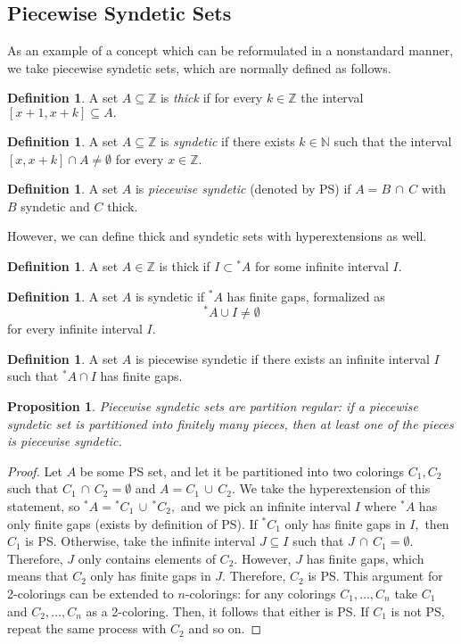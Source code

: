 \documentclass[12pt]{amsart}
\newcommand{\stt}{{}^*}
\newcommand{\NN}{\mathbb{N}}
\newcommand{\ZZ}{\mathbb{Z}}
\theoremstyle{plain}
\newtheorem{prop}[thm]{Proposition}
\theoremstyle{definition}
\newtheorem{defn}[thm]{Definition}
\theoremstyle{remark}
\theoremstyle{theorem}
\numberwithin{equation}{section}
\numberwithin{thm}{section}
\begin{document}
\subsection{Piecewise Syndetic Sets}
As an example of a concept which can be reformulated in a nonstandard manner, we take piecewise syndetic sets, which are normally defined as follows.
\begin{defn}
A set $A \subseteq \ZZ$ is \textit{thick} if for every $k \in \ZZ$ the interval $[x+1, x+k] \subseteq A.$
\end{defn}
\begin{defn}
A set $A \subseteq \ZZ$ is \textit{syndetic} if there exists $k \in \NN$ such that the interval $[x,x+k] \cap A \neq \emptyset$ for every $x \in \ZZ.$
\end{defn}
\begin{defn}
A set $A$ is \textit{piecewise syndetic} (denoted by PS) if $A = B \, \cap  \,C$ with $B$ syndetic and $C$ thick.
\end{defn}
However, we can define thick and syndetic sets with hyperextensions as well.
\begin{defn}
A set $A \in \ZZ$ is thick if $I \subset \stt A$ for some infinite interval $I.$
\end{defn}
\begin{defn}
A set $A$ is syndetic if $\stt A$ has finite gaps, formalized as \[\stt A \cup I \neq \emptyset\] for every infinite interval $I.$
\end{defn}
\begin{defn}
A set $A$ is piecewise syndetic if there exists an infinite interval $I$ such that $\stt A \cap I$ has finite gaps.
\end{defn}
\begin{prop}
Piecewise syndetic sets are partition regular: if a piecewise syndetic set is partitioned into finitely many pieces, then at least one of the pieces is piecewise syndetic.
\end{prop}
\begin{proof}
Let $A$ be some PS set, and let it be partitioned into two colorings $C_1, C_2$ such that $C_1 \, \cap \, C_2 = \emptyset$ and $A = C_1 \, \cup \, C_2.$ We take the hyperextension of this statement, so $\stt A =\stt C_1 \, \cup \, \stt C_2,$ and we pick an infinite interval $I$ where $\stt A$ has only finite gaps (exists by definition of PS). If $\stt C_1$ only has finite gaps in $I,$ then $C_1$ is PS. Otherwise, take the infinite interval $J \subseteq I$ such that $J \, \cap \, C_1 = \emptyset.$ Therefore, $J$ only contains elements of $C_2.$ However, $J$ has finite gaps, which means that $C_2$ only has finite gaps in $J.$ Therefore, $C_2$ is PS.
This argument for 2-colorings can be extended to $n$-colorings: for any colorings $C_1, \ldots , C_n$ take $C_1$ and $C_2, \ldots , C_n$ as a 2-coloring. Then, it follows that either is PS. If $C_1$ is not PS, repeat the same process with $C_2$ and so on.
\end{proof}
\end{document}
